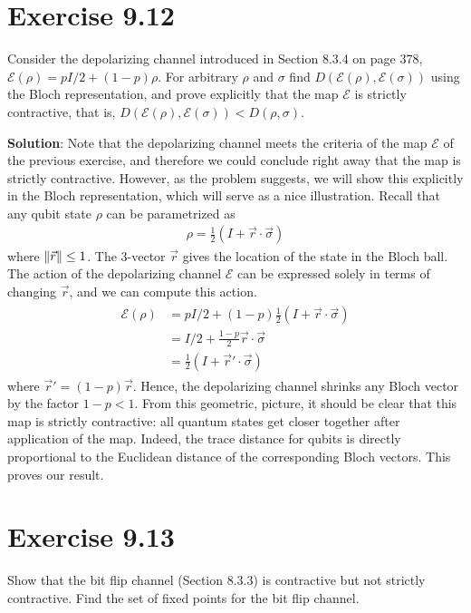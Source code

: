 \documentclass{book}
\newcommand{\mc}[1]{\mathcal{#1}}
\begin{document}
\section*{Exercise 9.12}
    Consider the depolarizing channel introduced in Section 8.3.4 on page 378, $\mc{E}(\rho) = pI/2 + (1 - p)\rho$. For arbitrary $\rho$ and $\sigma$ find $D(\mc{E}(\rho), \mc{E}(\sigma))$ using the Bloch representation, and prove explicitly that the map $\mc{E}$ is strictly contractive, that is, $D(\mc{E}(\rho), \mc{E}(\sigma)) < D(\rho, \sigma)$.
    
    \textbf{Solution}: Note that the depolarizing channel meets the criteria of the map $\mc{E}$ of the previous exercise, and therefore we could conclude right away that the map is strictly contractive. However, as the problem suggests, we will show this explicitly in the Bloch representation, which will serve as a nice illustration. Recall that any qubit state $\rho$ can be parametrized as 
    \begin{align}
        \rho = \frac{1}{2}(I+\Vec{r}\cdot\vec{\sigma})
    \end{align}
    where $\norm{\vec{r}} \leq 1$. The 3-vector $\vec{r}$ gives the location of the state in the Bloch ball. The action of the depolarizing channel $\mc{E}$ can be expressed solely in terms of changing $\vec{r}$, and we can compute this action.
    \begin{align}
    \begin{aligned}
        \mc{E}(\rho) &= pI/2 + (1-p)\frac{1}{2}(I+\vec{r}\cdot\vec{\sigma}) \\
        &= I/2 + \frac{1-p}{2}\vec{r}\cdot\vec{\sigma}\\
        &= \frac{1}{2}(I+\vec{r}'\cdot\vec{\sigma})
    \end{aligned}
    \end{align}
    where $\vec{r}' = (1-p) \vec{r}$. Hence, the depolarizing channel shrinks any Bloch vector by the factor $1-p<1$. From this geometric, picture, it should be clear that this map is strictly contractive: all quantum states get closer together after application of the map. Indeed, the trace distance for qubits is directly proportional to the Euclidean distance of the corresponding Bloch vectors. This proves our result. 
    
\section*{Exercise 9.13}
    Show that the bit flip channel (Section 8.3.3) is contractive but not strictly contractive. Find the set of fixed points for the bit flip channel.
    
\end{document}
